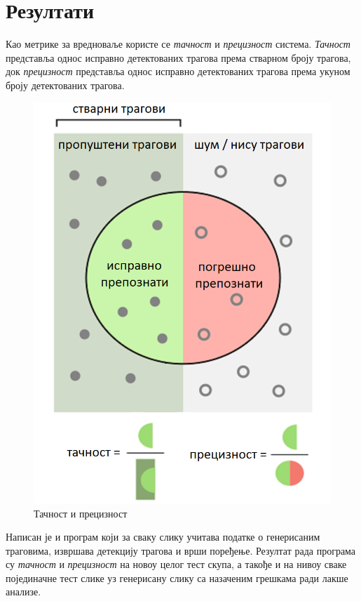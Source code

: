 \documentclass[12pt,a4paper,serbian,oneside]{book}
\begin{document}
\section{Резултати}

Као метрике за вредноваље користе се \textit{тачност} и \textit{прецизност} система. \textit{Тачност} представља однос исправно детектованих трагова према стварном броју трагова, док \textit{прецизност} представља однос исправно детектованих трагова према укуном броју детектованих трагова.

\begin{figure}[H]
\begin{center}
\includegraphics[width=120mm]{images/recall_prec.png}
\end{center}
\caption{Тачност и прецизност}
\label{fig:recall_prec}
\end{figure}

Написан је и програм који за сваку слику учитава податке о генерисаним траговима, извршава детекцију трагова и врши поређење. Резултат рада програма су \textit{тачност} и \textit{прецизност} на новоу целог тест скупа, а такође и на нивоу сваке појединачне тест слике уз генерисану слику са назаченим грешкама ради лакше анализе.
\end{document}
